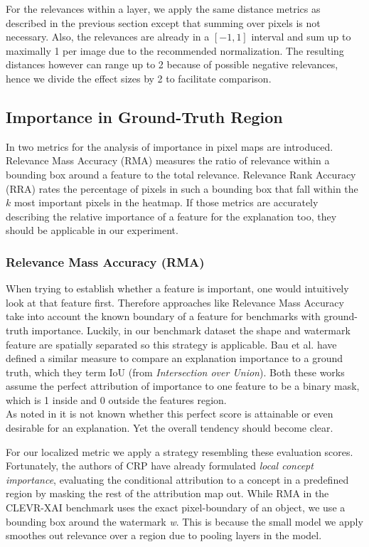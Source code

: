 For the relevances within a layer, we apply the same distance metrics as described in the previous section except that summing over pixels is not necessary. Also, the relevances are already in a $[-1,1]$ interval and sum up to maximally 1 per image due to the recommended normalization. The resulting distances however can range up to 2 because of possible negative relevances, hence we divide the effect sizes by 2 to facilitate comparison. 

\subsection{Importance in Ground-Truth Region}\label{section:region_specific}
In \cite{Arras2022} two metrics for the analysis of importance in pixel maps are introduced. Relevance Mass Accuracy (RMA) measures the ratio of relevance within a bounding box around a feature to the total relevance. Relevance Rank Accuracy (RRA) rates the percentage of pixels in such a bounding box that fall within the $k$ most important pixels in the heatmap. If those metrics are accurately describing the relative importance of a feature for the explanation too, they should be applicable in our experiment. 

\subsubsection{Relevance Mass Accuracy (RMA)}
When trying to establish whether a feature is important, one would intuitively look at that feature first. Therefore approaches like Relevance Mass Accuracy take into account the known boundary of a feature for benchmarks with ground-truth importance. Luckily, in our benchmark dataset the shape and watermark feature are spatially separated so this strategy is applicable.
Bau et al. \cite{Bau2017, Bau2020} have defined a similar measure to compare an explanation importance to a ground truth, which they term IoU (from \textit{Intersection over Union}). Both these works assume the perfect attribution of importance to one feature to be a binary mask, which is 1 inside and 0 outside the features region. \\
As noted in \cite{Arras2022} it is not known whether this perfect score is attainable or even desirable for an explanation. Yet the overall tendency should become clear.

For our localized metric we apply a strategy resembling these evaluation scores. 
Fortunately, the authors of CRP have already formulated \textit{local concept importance}, evaluating the conditional attribution to a concept in a predefined region by masking the rest of the attribution map out. 
While RMA in the CLEVR-XAI benchmark uses the exact pixel-boundary of an object, we use a bounding box around the watermark \textit{w}. This is because the small model we apply smoothes out relevance over a region due to pooling layers in the model. \\

